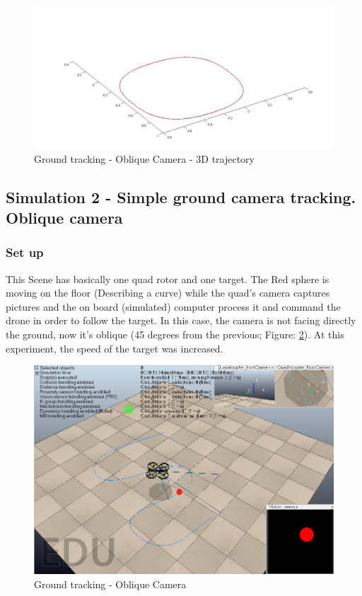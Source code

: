 \begin{figure}[ht]
\centering
\includegraphics[width=0.7\linewidth]{../Images/c3/sim1_traj_both_3d}
\caption{Ground tracking - Oblique Camera - 3D trajectory}
\label{fig:sim1_traj_both_3d}
\end{figure}




\subsection{Simulation 2 - Simple ground camera tracking. Oblique camera}
\subsubsection{Set up}
This Scene has basically one quad rotor and one target. The Red sphere is moving on the floor (Describing a curve) while the quad's camera captures pictures and the on board (simulated) computer process it and command the drone in order to follow the target. In this case, the camera is not facing directly the ground, now it's oblique (45 degrees from the previous; Figure: \ref{fig:ground_tracking_scene_oblique}). At this experiment, the speed of the target was increased.

\begin{figure}[hp]
	\centering
	\includegraphics[width=0.65\linewidth]{../Images/c3/ground_tracking_scene_oblique}
	\caption{Ground tracking - Oblique Camera}
	\label{fig:ground_tracking_scene_oblique}
\end{figure}

